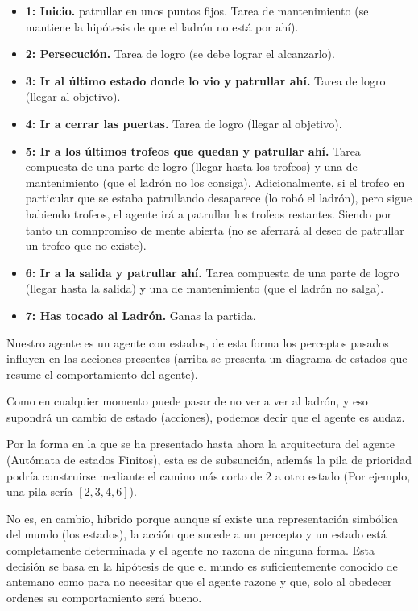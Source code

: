 \documentclass[a4paper,12.5pt]{article}
\begin{document}
\begin{itemize}
	\item \textbf{1: Inicio.} patrullar en unos puntos fijos. Tarea de mantenimiento (se mantiene la hipótesis de que el ladrón no está por ahí).
	\item \textbf{2: Persecución.} Tarea de logro (se debe lograr el alcanzarlo).
	\item \textbf{3: Ir al último estado donde lo vio y patrullar ahí.} Tarea de logro (llegar al objetivo).
	\item \textbf{4: Ir a cerrar las puertas.} Tarea de logro (llegar al objetivo).
\item \textbf{5: Ir a los últimos trofeos que quedan y patrullar ahí.} Tarea compuesta de una parte de logro (llegar hasta los trofeos) y una de mantenimiento (que el ladrón no los consiga). Adicionalmente, si el trofeo en particular que se estaba patrullando desaparece (lo robó el ladrón), pero sigue habiendo trofeos, el agente irá a patrullar los trofeos restantes. Siendo por tanto un comnpromiso de mente abierta (no se aferrará al deseo de patrullar un trofeo que no existe).
\item \textbf{6: Ir a la salida y patrullar ahí.} Tarea compuesta de una parte de logro (llegar hasta la salida) y una de mantenimiento (que el ladrón no salga). 
\item \textbf{7: Has tocado al Ladrón.} Ganas la partida.
\end{itemize}

Nuestro agente es un agente con estados, de esta forma los perceptos pasados influyen en las acciones presentes (arriba se presenta un diagrama de estados que resume el comportamiento del agente). 

Como en cualquier momento puede pasar de no ver a ver al  ladrón, y eso supondrá un cambio de estado (acciones), podemos decir que el agente es audaz.

Por la forma en la que se ha presentado hasta ahora la arquitectura  del agente (Autómata de estados Finitos), esta es de subsunción, además la pila de prioridad podría construirse mediante el camino más corto de $2$ a otro estado (Por ejemplo, una pila sería $[2,3,4,6]$).

No es, en cambio, híbrido porque aunque sí existe una representación simbólica del mundo (los estados), la acción que sucede a un percepto y un estado está completamente determinada y el agente no razona de ninguna forma. Esta decisión se basa en la hipótesis de que el mundo es suficientemente conocido de antemano como para no necesitar que el agente razone y que, solo al obedecer ordenes su comportamiento será bueno.
\end{document}
